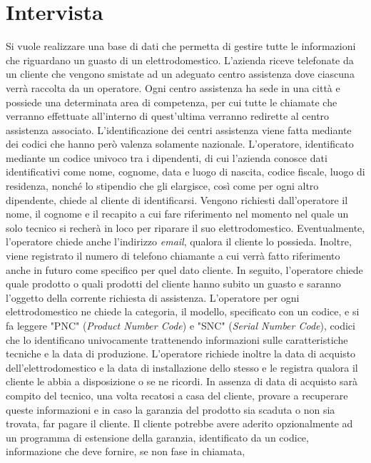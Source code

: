 \documentclass[a4paper, 12pt]{report}
\begin{document}
\section{Intervista}
Si vuole realizzare una base di dati che permetta di gestire tutte le informazioni che riguardano un guasto di un elettrodomestico.
L'azienda riceve telefonate da un cliente che vengono smistate ad un adeguato centro assistenza dove ciascuna verrà raccolta da un operatore.
Ogni centro assistenza ha sede in una città e possiede una determinata area di competenza, per cui tutte le chiamate che verranno effettuate
all'interno di quest'ultima verranno redirette al centro assistenza associato. L'identificazione dei centri assistenza viene fatta mediante dei
codici che hanno però valenza solamente nazionale.\newline
L'operatore, identificato mediante un codice univoco tra i dipendenti, di cui l'azienda conosce dati identificativi come nome, cognome, data
e luogo di nascita, codice fiscale, luogo di residenza, nonché lo stipendio che gli elargisce, così come per ogni altro dipendente, chiede al 
cliente di identificarsi. Vengono richiesti dall'operatore 
il nome, il cognome e il recapito a cui fare riferimento nel momento nel quale un solo tecnico si recherà in loco per riparare il suo elettrodomestico. 
Eventualmente, l'operatore chiede anche l'indirizzo \textit{email}, qualora il cliente lo possieda. Inoltre, viene registrato il numero di telefono 
chiamante a cui verrà fatto riferimento anche in futuro come specifico per quel dato cliente.\newline
In seguito, l'operatore chiede quale prodotto o quali prodotti del cliente hanno subito un guasto e saranno l'oggetto della corrente richiesta di 
assistenza. L'operatore per ogni elettrodomestico ne chiede la categoria, il modello, specificato con un codice, e si fa leggere "PNC" (\textit{Product 
Number Code}) e "SNC" (\textit{Serial Number Code}), codici che lo identificano univocamente trattenendo informazioni sulle caratteristiche tecniche e
la data di produzione. L'operatore richiede inoltre la data di acquisto dell'elettrodomestico e la data di installazione dello stesso e le registra qualora 
il cliente le abbia a disposizione o se ne ricordi. In assenza di data di acquisto sarà compito del tecnico, una volta recatosi a casa del cliente, 
provare a recuperare queste informazioni e in caso la garanzia del prodotto sia scaduta o non sia trovata, far pagare il cliente. Il cliente potrebbe avere 
aderito opzionalmente ad un programma di estensione della garanzia, identificato da un codice, informazione che deve fornire, se non fase in chiamata, 
\end{document}
